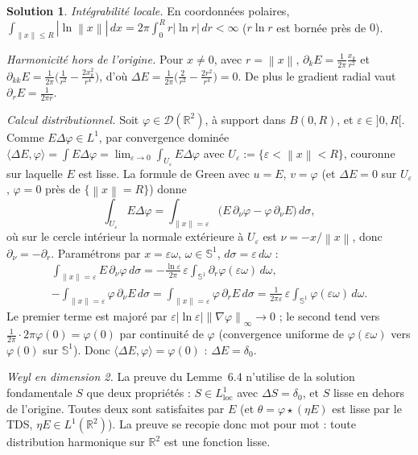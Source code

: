 \documentclass[11pt,a4paper]{article}
\newcommand{\R}{\mathbb{R}}
\newcommand{\norm}[1]{\left\|#1\right\|}
\newcommand{\Sun}{\mathbb{S}^1}
\newcommand{\D}{\mathcal{D}}
\theoremstyle{definition}
\newtheorem*{solution}{Solution}
\begin{document}
\begin{solution}
\emph{Intégrabilité locale.} En coordonnées polaires, $\int_{\norm x\le R}|\ln\norm x|\,dx=2\pi\int_0^Rr|\ln r|\,dr<\infty$ ($r\ln r$ est bornée près de $0$).

\emph{Harmonicité hors de l'origine.} Pour $x\ne0$, avec $r=\norm x$, $\partial_kE=\frac1{2\pi}\frac{x_k}{r^2}$ et $\partial_{kk}E=\frac1{2\pi}\big(\frac1{r^2}-\frac{2x_k^2}{r^4}\big)$, d'où $\Delta E=\frac1{2\pi}\big(\frac2{r^2}-\frac{2r^2}{r^4}\big)=0$. De plus le gradient radial vaut $\partial_rE=\frac1{2\pi r}$.

\emph{Calcul distributionnel.} Soit $\varphi\in\D(\R^2)$, à support dans $B(0,R)$, et $\varepsilon\in]0,R[$. Comme $E\Delta\varphi\in L^1$, par convergence dominée $\langle\Delta E,\varphi\rangle=\int E\Delta\varphi=\lim_{\varepsilon\to0}\int_{U_\varepsilon}E\Delta\varphi$ avec $U_\varepsilon:=\{\varepsilon<\norm x<R\}$, couronne sur laquelle $E$ est lisse. La formule de Green avec $u=E$, $v=\varphi$ (et $\Delta E=0$ sur $U_\varepsilon$, $\varphi=0$ près de $\{\norm x=R\}$) donne
\[
\int_{U_\varepsilon}E\Delta\varphi=\int_{\norm x=\varepsilon}\big(E\,\partial_\nu\varphi-\varphi\,\partial_\nu E\big)\,d\sigma ,
\]
où sur le cercle intérieur la normale extérieure à $U_\varepsilon$ est $\nu=-x/\norm x$, donc $\partial_\nu=-\partial_r$. Paramétrons par $x=\varepsilon\omega$, $\omega\in\Sun$, $d\sigma=\varepsilon\,d\omega$ :
\begin{gather*}
\int_{\norm x=\varepsilon}E\,\partial_\nu\varphi\,d\sigma=-\frac{\ln\varepsilon}{2\pi}\,\varepsilon\int_{\Sun}\partial_r\varphi(\varepsilon\omega)\,d\omega,\\
-\int_{\norm x=\varepsilon}\varphi\,\partial_\nu E\,d\sigma=\int_{\norm x=\varepsilon}\varphi\,\partial_rE\,d\sigma=\frac1{2\pi\varepsilon}\,\varepsilon\int_{\Sun}\varphi(\varepsilon\omega)\,d\omega .
\end{gather*}
Le premier terme est majoré par $\varepsilon|\ln\varepsilon|\norm{\nabla\varphi}_\infty\to0$ ; le second tend vers $\frac1{2\pi}\cdot2\pi\varphi(0)=\varphi(0)$ par continuité de $\varphi$ (convergence uniforme de $\varphi(\varepsilon\omega)$ vers $\varphi(0)$ sur $\Sun$). Donc $\langle\Delta E,\varphi\rangle=\varphi(0)$ : $\Delta E=\delta_0$.

\emph{Weyl en dimension 2.} La preuve du Lemme~6.4 n'utilise de la solution fondamentale $S$ que deux propriétés : $S\in L^1_{\mathrm{loc}}$ avec $\Delta S=\delta_0$, et $S$ lisse en dehors de l'origine. Toutes deux sont satisfaites par $E$ (et $\theta=\varphi\star(\eta E)$ est lisse par le TDS, $\eta E\in L^1(\R^2)$). La preuve se recopie donc mot pour mot : toute distribution harmonique sur $\R^2$ est une fonction lisse.
\end{solution}
\end{document}
